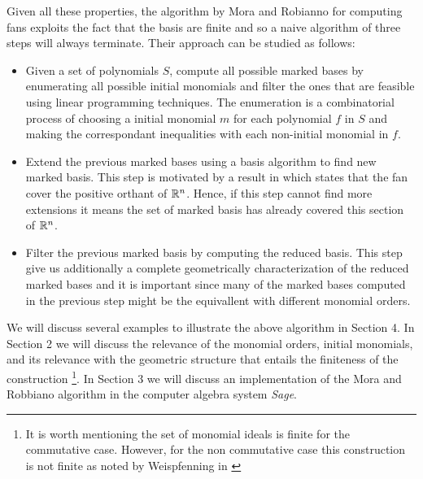 Given all these properties, the algorithm by Mora and Robianno \cite{MORA1988183}
for computing \grob fans exploits the fact that the \grob basis are finite and so
a naive algorithm of three steps will always terminate. Their approach can be
studied as follows:

\begin{itemize}
\item[1.] Given a set of polynomials $S$, compute all possible marked \grob bases
  by enumerating all possible initial monomials and filter the ones that are
  feasible using linear programming techniques. The enumeration is a combinatorial
  process of choosing a initial monomial $m$ for each polynomial $f$ in $S$ and making the
  correspondant inequalities with each non-initial monomial in $f$. 
\item[2.] Extend the previous marked \grob bases using a \grob basis algorithm
  to find new marked \grob basis. This step is motivated by a result in
  \cite{Cox:2014} which states that the \grob fan cover the positive orthant
  of $\mathbb{R}^n$. Hence, if this step cannot find more extensions it means
  the set of marked \grob basis has already covered this section of $\mathbb{R}^n$.
\item[3.] Filter the previous marked \grob basis by computing the reduced \grob
  basis. This step give us additionally a complete geometrically characterization
  of the reduced marked \grob bases and it is important since many of the marked
  \grob bases computed in the previous step might be the equivallent with different
  monomial orders. 
\end{itemize}

We will discuss several examples to illustrate the above algorithm in Section 4. In Section
2 we will discuss the relevance of the monomial orders, initial monomials, and its relevance
with the geometric structure that entails the finiteness of the construction \footnote{It is worth
  mentioning the set of monomial ideals is finite for the commutative case. However, for the non
  commutative case this construction is not finite as noted by Weispfenning in
  \cite{10.1007/3-540-51082-6_96}}. In Section 3 we will discuss an implementation of the
Mora and Robbiano algorithm in the computer algebra system \emph{Sage}.


